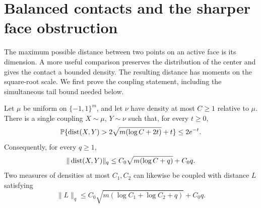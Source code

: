 \section{Balanced contacts and the sharper face obstruction}
\label{sec:balanced-contacts}

The maximum possible distance between two points on an active face is
its dimension. A more useful comparison preserves the distribution of
the center and gives the contact a bounded density. The resulting
distance has moments on the square-root scale. We first prove the
coupling statement, including the simultaneous tail bound needed below.

\begin{lemma}\label{lem:balanced-coupling}
Let $\mu$ be uniform on $\{-1,1\}^m$, and let $\nu$ have density at
most $C\ge1$ relative to $\mu$. There is a single coupling
$X\sim\mu$, $Y\sim\nu$ such that, for every $t\ge0$,
\begin{equation}\label{eq:balanced-tail}
 \mathbb P\{\operatorname{dist}(X,Y)>2\sqrt{m(\log C+2t)}+t\}\le2e^{-t}.
\end{equation}
Consequently, for every $q\ge1$,
\[
 \|\operatorname{dist}(X,Y)\|_q\le C_0\sqrt{m(\log C+q)}+C_0q.
\]
Two measures of densities at most $C_1,C_2$ can likewise be coupled
with distance $L$ satisfying
\begin{equation}\label{eq:two-density-distance}
 \|L\|_q\le C_0\sqrt{m(\log C_1+\log C_2+q)}+C_0q.
\end{equation}
\end{lemma}
